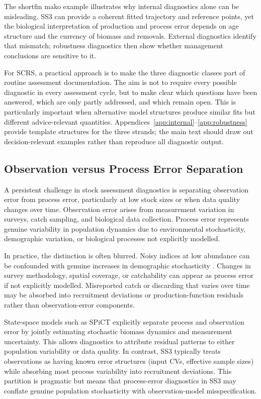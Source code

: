 \documentclass[11pt,a4paper]{article}
\begin{document}
The shortfin mako example illustrates why internal diagnostics alone can be misleading. SS3 can provide a coherent fitted trajectory and reference points, yet the biological interpretation of production and process error depends on age structure and the currency of biomass and removals. External diagnostics identify that mismatch; robustness diagnostics then show whether management conclusions are sensitive to it.

For SCRS, a practical approach is to make the three diagnostic classes part of routine assessment documentation. The aim is not to require every possible diagnostic in every assessment cycle, but to make clear which questions have been answered, which are only partly addressed, and which remain open. This is particularly important when alternative model structures produce similar fits but different advice-relevant quantities. Appendices~\ref{app:internal}--\ref{app:robustness} provide template structures for the three strands; the main text should draw out decision-relevant examples rather than reproduce all diagnostic output.

\subsection{Observation versus Process Error Separation}

A persistent challenge in stock assessment diagnostics is separating observation error from process error, particularly at low stock sizes or when data quality changes over time. Observation error arises from measurement variation in surveys, catch sampling, and biological data collection. Process error represents genuine variability in population dynamics due to environmental stochasticity, demographic variation, or biological processes not explicitly modelled.

In practice, the distinction is often blurred. Noisy indices at low abundance can be confounded with genuine increases in demographic stochasticity \citep{clark2004population}. Changes in survey methodology, spatial coverage, or catchability can appear as process error if not explicitly modelled. Misreported catch or discarding that varies over time may be absorbed into recruitment deviations or production-function residuals rather than observation-error components.

State-space models such as SPiCT explicitly separate process and observation error by jointly estimating stochastic biomass dynamics and measurement uncertainty. This allows diagnostics to attribute residual patterns to either population variability or data quality. In contrast, SS3 typically treats observations as having known error structures (input CVs, effective sample sizes) while absorbing most process variability into recruitment deviations. This partition is pragmatic but means that process-error diagnostics in SS3 may conflate genuine population stochasticity with observation-model misspecification.
\end{document}
